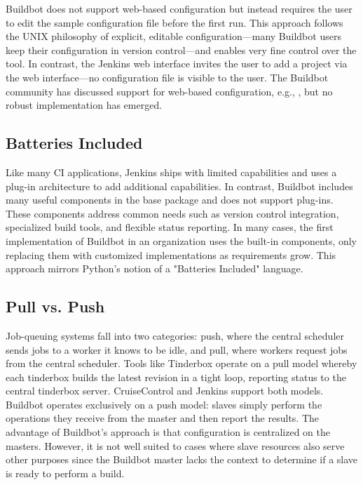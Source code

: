 \documentclass[conference]{IEEEtran}
\begin{document}
Buildbot does not support web-based configuration but instead requires the user to edit the sample configuration file before the first run.
This approach follows the UNIX philosophy of explicit, editable configuration---many Buildbot users keep their configuration in version control---and enables very fine control over the tool.
In contrast, the Jenkins web interface invites the user to add a project via the web interface---no configuration file is visible to the user.
The Buildbot community has discussed support for web-based configuration, e.g., \cite{config-discussion}, but no robust implementation has emerged.

\subsection{Batteries Included}

Like many CI applications, Jenkins ships with limited capabilities and uses a plug-in architecture\cite{jenkins-plugins} to add additional capabilities.
In contrast, Buildbot includes many useful components in the base package and does not support plug-ins.
These components address common needs such as version control integration, specialized build tools, and flexible status reporting.
In many cases, the first implementation of Buildbot in an organization uses the built-in components, only replacing them with customized implementations as requirements grow.
This approach mirrors Python's notion of a "Batteries Included" language.

\subsection{Pull vs. Push}

Job-queuing systems fall into two categories: push, where the central scheduler sends jobs to a worker it knows to be idle, and pull, where workers request jobs from the central scheduler.
Tools like Tinderbox\cite{tinderbox} operate on a pull model whereby each tinderbox builds the latest revision in a tight loop, reporting status to the central tinderbox server.
CruiseControl and Jenkins support both models.
Buildbot operates exclusively on a push model: slaves simply perform the operations they receive from the master and then report the results.
The advantage of Buildbot's approach is that configuration is centralized on the masters.
However, it is not well suited to cases where slave resources also serve other purposes since the Buildbot master lacks the context to determine if a slave is ready to perform a build.
\end{document}
